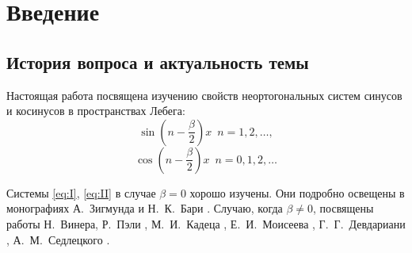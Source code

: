 \documentclass[oneside, final, 14pt]{extreport}
\begin{document}
\newcommand\sincoeffs{\int\limits_0^{\pi}\sin\left(n - \frac{\beta}{2}\right)xdx,
	\enspace n = 1, 2, \dots}
\newcommand\sinCNull{\int\limits_0^{\pi}f(x)\sin\left(n - \frac{\beta}{2}\right)xdx = 0,
	\enspace n = 1, 2, \dots}
\newcommand\mainFunc[1]{\left(\cos\frac{#1}{2}\right)^{-\beta-1}\sin\frac{#1}{2}}
\newcommand\msin[1]{\sin\left(n - \frac{\beta}{2}\right)#1}
\newcommand\msindots[1]{\sin\left(n - \frac{\beta}{2}\right)#1, n = 1, 2, \ldots}
\newcommand\mcos[1]{\cos\left(n - \frac{\beta}{2}\right)#1}
\newcommand\mCoeff{n - \frac{\beta}{2}}
\newcommand\Real{\operatorname{Re}}
\newcommand\Imag{\operatorname{Im}}
\newcommand\pv[1]{\mathrel{\stackrel{\makebox[0pt]{\mbox{\normalfont\tiny п.в.}}}{#1}}}
\newcommand\phisys[2]{\{\phi_#1(#2)\}}
\newcommand\bsin[1]{h_n^s(#1)=\frac{2}{\pi}\sum\limits_{k = 0}^{n - 1}C_{\beta}^k\sin(n - k)#1\Bigg(2\cos\left(\frac{\theta}{2}\right)\Bigg)^{-\beta}}
\newcommand\bcos[1]{h^c_k(#1) = \frac{2C^k_\beta}{\pi(2\cos\frac{#1}{2})^\beta}\Real\Bigg[F(-k; 1; \beta - k; -e^{i#1}) - \frac{1}{2}\Bigg]}





\setcounter{chapter}{1}
\chapter*{Введение}

\section{История вопроса и актуальность темы}
Настоящая работа посвящена изучению свойств неортогональных систем синусов и косинусов в пространствах Лебега:
\begin{equation}
	\msin{x} \enspace n = 1, 2, \dots, \tag{I}\label{eq:I}
\end{equation}
\begin{equation}
	\mcos{x} \enspace n = 0, 1, 2, \dots \tag{II}\label{eq:II}
\end{equation}

Системы \eqref{eq:I}, \eqref{eq:II} в случае $\beta = 0$ хорошо изучены. Они подробно освещены в монографиях
А.~Зигмунда \cite{zigmund} и Н.~К.~Бари \cite{bari}. Случаю, когда $\beta \neq 0$, посвящены работы 
Н.~Винера, Р.~Пэли \cite{paley-wiener}, М.~И.~Кадеца \cite{kadec}, Е.~И.~Моисеева \cite{moiseev-dan},
Г.~Г.~Девдариани \cite{devdariani}, А.~М.~Седлецкого \cite{moiseev-sedleckiy}.
\end{document}
